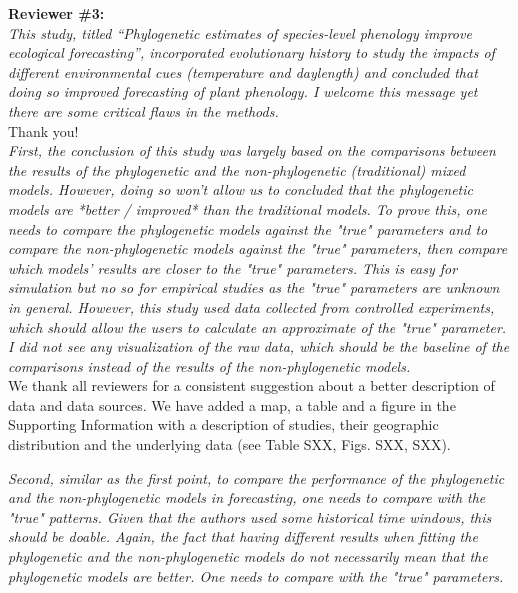 \documentclass[11pt]{article}
\begin{document}
{\bf Reviewer \#3:}\\

\emph{This study, titled “Phylogenetic estimates of species-level phenology improve ecological forecasting”, incorporated evolutionary history to study the impacts of different environmental cues (temperature and daylength) and concluded that doing so improved forecasting of plant phenology. I welcome this message yet there are some critical flaws in the methods.}\\

Thank you!\\

\emph{First, the conclusion of this study was largely based on the comparisons between the results of the phylogenetic and the non-phylogenetic (traditional) mixed models. However, doing so won't allow us to concluded that the phylogenetic models are *better / improved* than the traditional models. To prove this, one needs to compare the phylogenetic models against the "true" parameters and to compare the non-phylogenetic models against the "true" parameters, then compare which models' results are closer to the "true" parameters. This is easy for simulation but no so for empirical studies as the "true" parameters are unknown in general. However, this study used data collected from controlled experiments, which should allow the users to calculate an approximate of the "true" parameter. I did not see any visualization of the raw data, which should be the baseline of the comparisons instead of the results of the non-phylogenetic models.}\\
We thank all reviewers for a consistent suggestion about a better description of data and data sources. We have added a map, a table and a figure in the Supporting Information with a description of studies, their geographic distribution and the underlying data (see Table SXX, Figs. SXX, SXX).

\emph{Second, similar as the first point, to compare the performance of the phylogenetic and the non-phylogenetic models in forecasting, one needs to compare with the "true" patterns. Given that the authors used some historical time windows, this should be doable. Again, the fact that having different results when fitting the phylogenetic and the non-phylogenetic models do not necessarily mean that the phylogenetic models are better. One needs to compare with the "true" parameters.}\\
\end{document}
